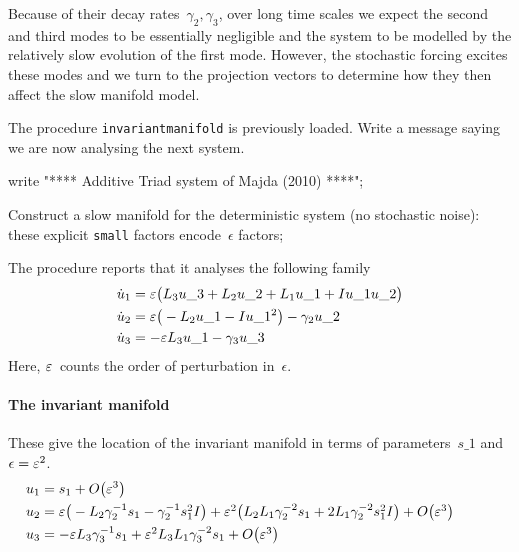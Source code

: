 Because of their decay rates~\(\gamma_2,\gamma_3\), over
long time scales we expect the second and third modes to be
essentially negligible and the system to be modelled by the
relatively slow evolution of the first mode. However, the
stochastic forcing excites these modes and we turn to the
projection vectors to determine how they then affect the
slow manifold model.


The procedure \verb|invariantmanifold| is previously loaded.
Write a message saying we are now analysing the next system.
\begin{reduce}
write "**** Additive Triad system of Majda (2010) ****";
\end{reduce}
Construct a slow manifold for the deterministic system (no
stochastic noise): these explicit \verb|small| factors
encode~\(\epsilon\) factors;

The procedure reports that it analyses the following family 
\begin{align*}&
\dot u_{1}=\varepsilon \big(L_{3} u\_3+L_{2} u\_2+L_{1} u\_1+I u\_1 u\_2\big)
\\&
\dot u_{2}=\varepsilon \big(-L_{2} u\_1-I u\_1^{2}\big)-\gamma _{2} u\_2
\\&
\dot u_{3}=-\varepsilon L_{3} u\_1-\gamma _{3} u\_3
\end{align*}
Here, \(\varepsilon\)\ counts the order of perturbation
in~\(\epsilon\).

\paragraph{The invariant manifold}
These give the location of the invariant manifold in terms
of parameters~\(s\_ 1\) and \(\epsilon=\varepsilon^2\).
\begin{align*}&
u_{1}=s_{1}+O\big(\varepsilon ^{3}\big)
\\&
u_{2}=\ParMath{ \eps \big(-L_{2} \gamma _{2}^{-1} s_{1}
-\gamma _{2}^{-1} s_{1}^{2} I\big) +\eps^{2} \big(L_{2}
L_{1} \gamma _{2}^{-2} s_{1} +2 L_{1} \gamma _{2}^{-2}
s_{1}^{2} I\big) +O\big(\varepsilon ^{3}\big)
}\\&
u_{3}=\ParMath{ -\eps L_{3} \gamma _{3}^{-1} s_{1}
+\eps^{2} L_{3} L_{1} \gamma _{3}^{-2} s_{1}
+O\big(\varepsilon ^{3}\big)
}
\end{align*}
